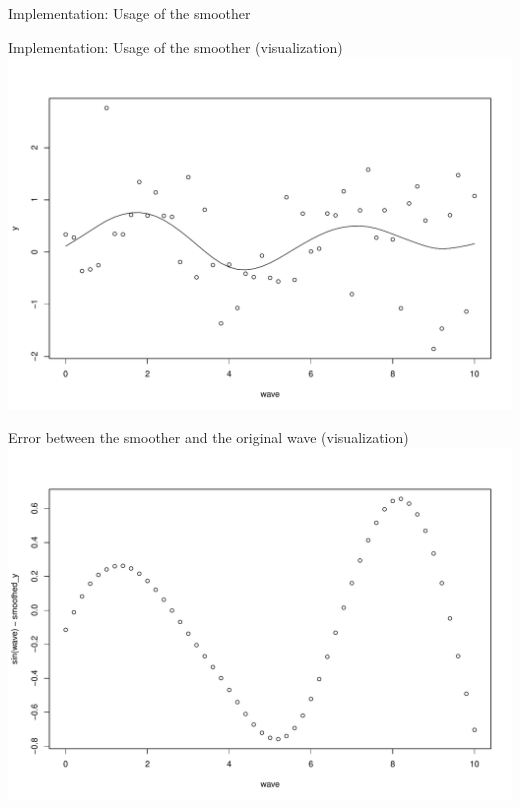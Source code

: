 \documentclass[
  ignorenonframetext,
]{beamer}
\begin{document}
\begin{frame}{Implementation: Usage of the smoother}
\protect\hypertarget{implementation-usage-of-the-smoother}{}
\end{frame}

\begin{frame}{Implementation: Usage of the smoother (visualization)}
\protect\hypertarget{implementation-usage-of-the-smoother-visualization}{}
\includegraphics{CSwR22_Group2_BivariateSmoothing_Presentation_files/figure-beamer/unnamed-chunk-6-1.pdf}
\end{frame}

\begin{frame}{Error between the smoother and the original wave
(visualization)}
\protect\hypertarget{error-between-the-smoother-and-the-original-wave-visualization}{}
\includegraphics{CSwR22_Group2_BivariateSmoothing_Presentation_files/figure-beamer/unnamed-chunk-7-1.pdf}
\end{frame}
\end{document}
